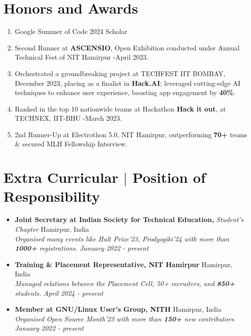 \documentclass[legalpaper,10.5pt]{article}
\begin{document}
\section{Honors and Awards}
\begin{enumerate}[leftmargin=*, itemsep=0em]
    \item Google Summer of Code 2024 Scholar
    \item Second Runner at \textbf{ASCENSIO}, Open Exhibition conducted under Annual Technical Fest of NIT Hamirpur -April 2023.
    \item Orchestrated a groundbreaking project at TECHFEST IIT BOMBAY, December 2023, placing as a finalist in \textbf{Hack.AI}; leveraged cutting-edge AI techniques to enhance user experience, boosting app engagement by \textbf{40\%}.
    \item Ranked in the top 10 nationwide teams at Hackathon \textbf{Hack it out}, at TECHNEX, IIT-BHU -March 2023.
    \item 2nd Runner-Up at Electrothon 5.0, NIT Hamirpur, outperforming \textbf{70+} teams \& secured MLH Fellowship Interview.
\end{enumerate}


\section{Extra Curricular $|$ \normalsize{Position of Responsibility}}

\begin{itemize}[leftmargin=*, itemsep=0em]
    \item \textbf {Joint Secretary at Indian Society for Technical Education,} \textit{Student's Chapter} \hfill Hamirpur, India\\
    \textit{Organised many events like Hult Prize'23, Prodyogiki'24 with more than \textbf{1000+} registrations. \hfill January 2022 - present}
    
    \item \textbf {Training \& Placement Representative, NIT Hamirpur} \hfill Hamirpur, India\\
    \textit{ \small Managed relations between the Placement Cell, 50+ recruiters, and \textbf{850+} students. \hfill April 2024 - present}
    
    \item \textbf{Member at GNU/Linux User's Group, NITH} \hfill Hamirpur, India\\
    \textit {\small Organised Open Source Month'23 with more than \textbf{150+} new contributors. \hfill January 2022 - present} 
\end{itemize}
\end{document}
